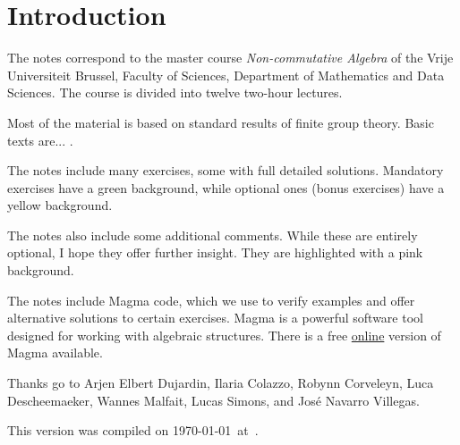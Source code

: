 \section*{Introduction}

The notes correspond to the master  
course \emph{Non-commutative Algebra} of the 
Vrije Universiteit Brussel, 
Faculty of Sciences, 
Department of Mathematics and Data Sciences. The course
is divided into twelve two-hour lectures. 

Most of the material is based on standard
results of finite group theory.
Basic texts are... \cite{MR2426855}.

The notes include many exercises, some with full detailed solutions. Mandatory exercises have a \colorbox{green!5!white}{green background}, while optional ones
(bonus exercises) have a \colorbox{yellow!15!white}{yellow background}.

The notes also include some additional comments. While these are entirely optional, I hope they offer further insight. They are highlighted with a \colorbox{red!5!white}{pink background}.

The notes include Magma code, which we use to verify examples and offer alternative solutions to certain exercises. Magma \cite{zbMATH01077111} is a powerful software tool designed for working with algebraic structures. There is a free \href{https://magma.maths.usyd.edu.au/calc/}{online} version of Magma available.

 
Thanks go to Arjen Elbert Dujardin, Ilaria Colazzo, Robynn Corveleyn, 
Luca Descheemaeker, Wannes Malfait, Lucas Simons, 
and
José Navarro Villegas. 


This version 
was compiled on \today~at~\currenttime.

